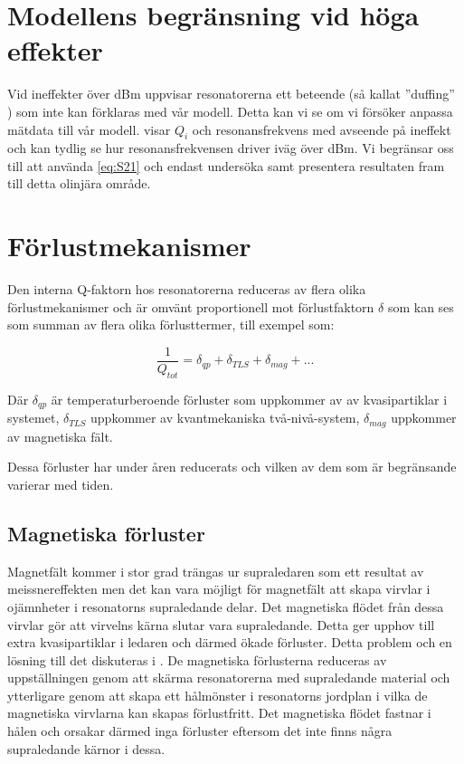 \documentclass[main.tex]{subfiles}
\begin{document}
\section{Modellens begränsning vid höga effekter}
Vid ineffekter över \unit[-70]{dBm} uppvisar resonatorerna ett beteende (så kallat ''duffing'' \cite{tholen2007}) som inte kan förklaras med vår modell. Detta kan vi se om vi försöker anpassa mätdata till vår modell.  visar $Q_i$ och resonansfrekvens med avseende på ineffekt och kan tydlig se hur resonansfrekvensen driver iväg över \unit[-70]{dBm}. Vi begränsar oss till att använda \ref{eq:S21} och endast undersöka samt presentera resultaten fram till detta olinjära område.


\section{Förlustmekanismer}
\label{sec:losses}
Den interna Q-faktorn hos resonatorerna reduceras av flera olika förlustmekanismer och är omvänt proportionell mot förlustfaktorn $\delta$ som kan ses som summan av flera olika förlusttermer\cite{Boehme2016,Goetz2016}, till exempel som:

\begin{equation}
    \label{ekv:Qtot}
    \frac{1}{Q_{tot}}=\delta_{qp}+\delta_{TLS}+\delta_{mag}+...
\end{equation}
\noindent

Där $\delta_{qp}$ är temperaturberoende förluster som uppkommer av av kvasipartiklar i systemet, $\delta_{TLS}$ uppkommer av kvantmekaniska två-nivå-system, $\delta_{mag}$ uppkommer av magnetiska fält. 

Dessa förluster har under åren reducerats och vilken av dem som är begränsande varierar med tiden.

\subsection{Magnetiska förluster}
\label{sek:mag}
Magnetfält kommer i stor grad trängas ur supraledaren som ett resultat av meissnereffekten men det kan vara möjligt för magnetfält att skapa virvlar i ojämnheter i resonatorns supraledande delar. Det magnetiska flödet från dessa virvlar gör att virvelns kärna slutar vara supraledande. Detta ger upphov till extra kvasipartiklar i ledaren och därmed ökade förluster. Detta problem och en lösning till det diskuteras i \cite{Chiaro2016}. De magnetiska förlusterna reduceras av uppställningen genom att skärma resonatorerna med supraledande material och ytterligare genom att skapa ett hålmönster i resonatorns jordplan i vilka de magnetiska virvlarna kan skapas förlustfritt\cite{Chiaro2016}. Det magnetiska flödet fastnar i hålen och orsakar därmed inga förluster\cite{Chiaro2016} eftersom det inte finns några supraledande kärnor i dessa.
\end{document}
